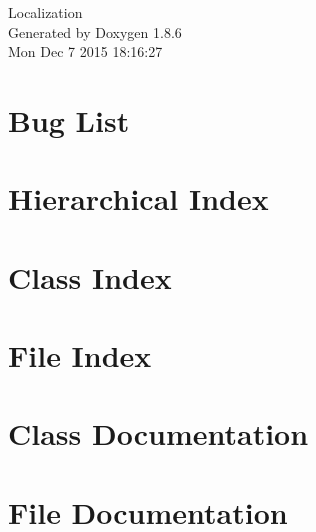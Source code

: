 \documentclass[twoside]{book}
\newcommand{\clearemptydoublepage}{%
  \newpage{\pagestyle{empty}\cleardoublepage}%
}
\begin{document}
\hypersetup{pageanchor=false}
\begin{titlepage}
\vspace*{7cm}
\begin{center}%
{\Large Localization }\\
\vspace*{1cm}
{\large Generated by Doxygen 1.8.6}\\
\vspace*{0.5cm}
{\small Mon Dec 7 2015 18:16:27}\\
\end{center}
\end{titlepage}
\clearemptydoublepage
\tableofcontents
\clearemptydoublepage
{}
\hypersetup{pageanchor=true}

\chapter{Bug List}
\label{bug}
\hypertarget{bug}{}

\chapter{Hierarchical Index}

\chapter{Class Index}

\chapter{File Index}

\chapter{Class Documentation}




















\chapter{File Documentation}






















\newpage
{}
{}
\printindex
\end{document}
